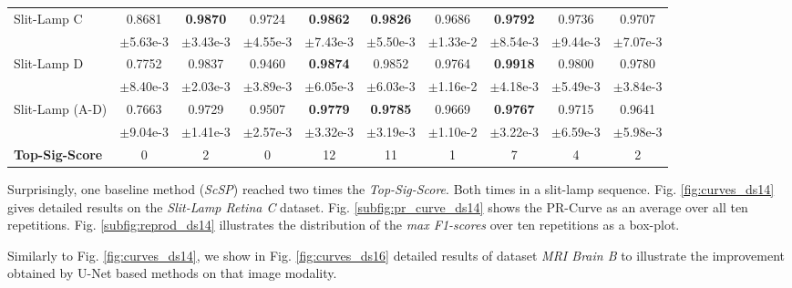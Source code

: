 \begin{table}[!htbp]
\begin{tabular}{l|*{9}{c|}}
      {\scriptsize Slit-Lamp C} & \scriptsize 0.8681 & {\color{red} \textbf{\scriptsize 0.9870}} & \scriptsize 0.9724 & \textbf{\scriptsize 0.9862} & \textbf{\scriptsize 0.9826} & \scriptsize 0.9686 & \textbf{\scriptsize 0.9792} & \scriptsize 0.9736 & \scriptsize 0.9707 \\[-4pt]
       & \tiny $\pm$5.63e-3 & \tiny $\pm$3.43e-3 & \tiny $\pm$4.55e-3 & \tiny $\pm$7.43e-3 & \tiny $\pm$5.50e-3 & \tiny $\pm$1.33e-2 & \tiny $\pm$8.54e-3 & \tiny $\pm$9.44e-3 & \tiny $\pm$7.07e-3 \\\midrule
      {\scriptsize Slit-Lamp D} & \scriptsize 0.7752 & \scriptsize 0.9837 & \scriptsize 0.9460 & \textbf{\scriptsize 0.9874} & \scriptsize 0.9852 & \scriptsize 0.9764 & {\color{red} \textbf{\scriptsize 0.9918}} & \scriptsize 0.9800 & \scriptsize 0.9780 \\[-4pt]
       & \tiny $\pm$8.40e-3 & \tiny $\pm$2.03e-3 & \tiny $\pm$3.89e-3 & \tiny $\pm$6.05e-3 & \tiny $\pm$6.03e-3 & \tiny $\pm$1.16e-2 & \tiny $\pm$4.18e-3 & \tiny $\pm$5.49e-3 & \tiny $\pm$3.84e-3 \\\midrule
      {\scriptsize Slit-Lamp (A-D)} & \scriptsize 0.7663 & \scriptsize 0.9729 & \scriptsize 0.9507 & \textbf{\scriptsize 0.9779} & {\color{red} \textbf{\scriptsize 0.9785}} & \scriptsize 0.9669 & \textbf{\scriptsize 0.9767} & \scriptsize 0.9715 & \scriptsize 0.9641 \\[-4pt]
       & \tiny $\pm$9.04e-3 & \tiny $\pm$1.41e-3 & \tiny $\pm$2.57e-3 & \tiny $\pm$3.32e-3 & \tiny $\pm$3.19e-3 & \tiny $\pm$1.10e-2 & \tiny $\pm$3.22e-3 & \tiny $\pm$6.59e-3 & \tiny $\pm$5.98e-3 \\\bottomrule\toprule
      {\scriptsize \textbf{Top-Sig-Score}} & 0 & 2 & 0 & 12 & 11 & 1 & 7 & 4 & 2 \\\bottomrule
   \end{tabular}
   \label{tab:final_results}
\end{table}

Surprisingly, one baseline method (\textit{ScSP}) reached two times the \textit{Top-Sig-Score}. Both times in a slit-lamp sequence. Fig. \ref{fig:curves_ds14} gives detailed results on the \textit{Slit-Lamp Retina C} dataset. Fig. \ref{subfig:pr_curve_ds14} shows the PR-Curve as an average over all ten repetitions. Fig. \ref{subfig:reprod_ds14} illustrates the distribution of the \textit{max F1-scores} over ten repetitions as a box-plot.

Similarly to Fig. \ref{fig:curves_ds14}, we show in Fig. \ref{fig:curves_ds16} detailed results of dataset \textit{MRI Brain B} to illustrate the improvement obtained by U-Net based methods on that image modality.

